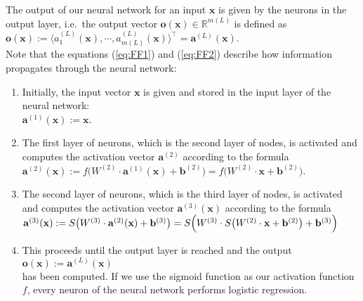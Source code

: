 The output of our neural network for an input $\mathbf{x}$ is given by the neurons in the output
layer,  i.e.~the output vector 
$\mathbf{o}(\mathbf{x}) \in \mathbb{R}^{m(L)}$ is defined as 
\\[0.2cm]
\hspace*{1.3cm}
$\mathbf{o}(\mathbf{x}) :=
 \bigl\langle a^{(L)}_1(\mathbf{x}), \cdots, a^{(L)}_{m(L)}(\mathbf{x}) \bigr\rangle^\top = \mathbf{a}^{(L)}(\mathbf{x})$.
\\[0.2cm]
Note that the equations (\ref{eq:FF1}) and (\ref{eq:FF2}) describe how information propagates
through the neural network: 
\begin{enumerate}
\item Initially, the input vector $\mathbf{x}$ is given and stored in the input layer of the neural network:
      \\[0.2cm]
      \hspace*{1.3cm}
      $\mathbf{a}^{(1)}(\mathbf{x}) := \mathbf{x}$.
\item The first layer of neurons, which is the second layer of nodes,  is activated and computes the activation
      vector $\mathbf{a}^{(2)}$ according to the formula
      \\[0.2cm]
      \hspace*{1.3cm}
      $\mathbf{a}^{(2)}(\mathbf{x}) := f\bigl(W^{(2)} \cdot \mathbf{a}^{(1)}(\mathbf{x}) + \mathbf{b}^{(2)}\bigr) = 
                                        f\bigl(W^{(2)} \cdot \mathbf{x} + \mathbf{b}^{(2)}\bigr)
      $.
\item The second layer of neurons, which is the third layer of nodes,  is activated and computes the activation
      vector $\mathbf{a}^{(3)}(\mathbf{x})$ according to the formula
      \\[0.2cm]
      \hspace*{1.3cm}
      $\mathbf{a}^{(3)}(\mathbf{x}) := S\bigl(W^{(3)} \cdot \mathbf{a}^{(2)}(\mathbf{x}) + \mathbf{b}^{(3)}\bigr)
                          = S\Bigl(W^{(3)} \cdot S\bigl(W^{(2)} \cdot \mathbf{x} + \mathbf{b}^{(2)}\bigr) + \mathbf{b}^{(3)}\Bigr)
        $
\item This proceeds until the output layer is reached and the output
      \\[0.2cm]
      \hspace*{1.3cm}
      $\mathbf{o}(\mathbf{x}) := \mathbf{a}^{(L)}(\mathbf{x})$
      \\[0.2cm]
      has been computed.  If we use the sigmoid function as our activation function $f$, every neuron of
      the neural network performs logistic regression. 
\end{enumerate}
